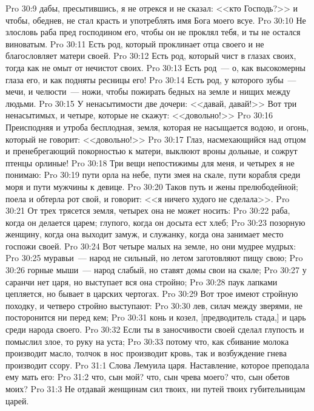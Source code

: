 \vs Pro 30:9 дабы, пресытившись, я не отрекся  и не сказал: <<кто Господь?>> и чтобы, обеднев, не стал красть и употреблять имя Бога моего всуе.
\vs Pro 30:10 Не злословь раба пред господином его, чтобы он не проклял тебя, и ты не остался виноватым.
\vs Pro 30:11 Есть род, который проклинает отца своего и не благословляет матери своей.
\vs Pro 30:12 Есть род, который чист в глазах своих, тогда как не омыт от нечистот своих.
\vs Pro 30:13 Есть род~--- о, как высокомерны глаза его, и как подняты ресницы его!
\vs Pro 30:14 Есть род, у которого зубы~--- мечи, и челюсти~--- ножи, чтобы пожирать бедных на земле и нищих между людьми.
\vs Pro 30:15 У ненасытимости две дочери: <<давай, давай!>> Вот три ненасытимых, и четыре, которые не скажут: <<довольно!>>
\vs Pro 30:16 Преисподняя и утроба бесплодная, земля, которая не насыщается водою, и огонь, который не говорит: <<довольно!>>
\vs Pro 30:17 Глаз, насмехающийся над отцом и пренебрегающий покорностью к матери, выклюют вроны дольные, и сожрут птенцы орлиные!
\vs Pro 30:18 Три вещи непостижимы для меня, и четырех я не понимаю:
\vs Pro 30:19 пути орла на небе, пути змея на скале, пути корабля среди моря и пути мужчины к девице.
\vs Pro 30:20 Таков путь и жены прелюбодейной; поела и обтерла рот свой, и говорит: <<я ничего худого не сделала>>.
\vs Pro 30:21 От трех трясется земля, четырех она не может носить:
\vs Pro 30:22 раба, когда он делается царем; глупого, когда он досыта ест хлеб;
\vs Pro 30:23 позорную женщину, когда она выходит замуж, и служанку, когда она занимает место госпожи своей.
\vs Pro 30:24 Вот четыре малых на земле, но они мудрее мудрых:
\vs Pro 30:25 муравьи~--- народ не сильный, но летом заготовляют пищу свою;
\vs Pro 30:26 горные мыши~--- народ слабый, но ставят домы свои на скале;
\vs Pro 30:27 у саранчи нет царя, но выступает вся она стройно;
\vs Pro 30:28 паук лапками цепляется, но бывает в царских чертогах.
\vs Pro 30:29 Вот трое имеют стройную походку, и четверо стройно выступают:
\vs Pro 30:30 лев, силач между зверями, не посторонится ни перед кем;
\vs Pro 30:31 конь и козел, [предводитель стада,] и царь среди народа своего.
\vs Pro 30:32 Если ты в заносчивости своей сделал глупость и помыслил злое, то  руку на уста;
\vs Pro 30:33 потому что, как сбивание молока производит масло, толчок в нос производит кровь, так и возбуждение гнева производит ссору.
\vs Pro 31:1 Слова Лемуила царя. Наставление, которое преподала ему мать его:
\vs Pro 31:2 что, сын мой? что, сын чрева моего? что, сын обетов моих?
\vs Pro 31:3 Не отдавай женщинам сил твоих, ни путей твоих губительницам царей.

